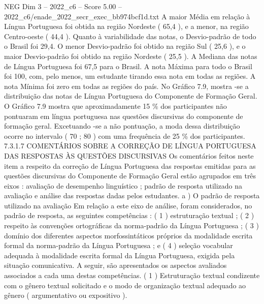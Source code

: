 \begin{textsample}{NEG Dim 3 – 2022\_c6 – Score 5.00 – 2022\_c6/enade\_2022\_secr\_exec\_bb974bcf1d.txt}
A maior Média em relação à Língua Portuguesa foi obtida na região Nordeste ( 65,4 ), e a menor, na região Centro-oeste ( 44,4 ).
Quanto à variabilidade das notas, o Desvio-padrão de todo o Brasil foi 29,4.
O menor Desvio-padrão foi obtido na região Sul ( 25,6 ), e o maior Desvio-padrão foi obtido na região Nordeste ( 25,5 ).
A Mediana das notas de Língua Portuguesa foi 67,5 para o Brasil.
A nota Máxima para todo o Brasil foi 100, com, pelo menos, um estudante tirando essa nota em todas as regiões.
A nota Mínima foi zero em todas as regiões do país.
No Gráfico 7.9, mostra -se a distribuição das notas de Língua Portuguesa do Componente de Formação Geral.
O Gráfico 7.9 mostra que aproximadamente 15 \% dos participantes não pontuaram em língua portuguesa nas questões discursivas do componente de formação geral.
Excetuando -se a não pontuação, a moda dessa distribuição ocorre no intervalo ( 70 ; 80 ) com uma frequência de 25 \% dos participantes. 7.3.1.7 COMENTÁRIOS SOBRE A CORREÇÃO DE LÍNGUA PORTUGUESA DAS RESPOSTAS ÀS QUESTÕES DISCURSIVAS Os comentários feitos neste item a respeito da correção de Língua Portuguesa das respostas emitidas para as questões discursivas do Componente de Formação Geral estão agrupados em três eixos : avaliação de desempenho linguístico ; padrão de resposta utilizado na avaliação e análise das respostas dadas pelos estudantes. a ) O padrão de resposta utilizado na avaliação Em relação a este eixo de análise, foram considerados, no padrão de resposta, as seguintes competências : ( 1 ) estruturação textual ; ( 2 ) respeito às convenções ortográficas da norma-padrão da Língua Portuguesa ; ( 3 ) domínio dos diferentes aspectos morfossintáticos próprios da modalidade escrita formal da norma-padrão da Língua Portuguesa ; e ( 4 ) seleção vocabular adequada à modalidade escrita formal da Língua Portuguesa, exigida pela situação comunicativa.
A seguir, são apresentados os aspectos avaliados associados a cada uma destas competências. ( 1 ) Estruturação textual condizente com o gênero textual solicitado e o modo de organização textual adequado ao gênero ( argumentativo ou expositivo ).

\end{textsample}
